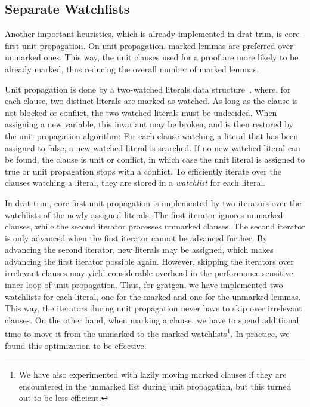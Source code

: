 \documentclass[smallcondensed]{svjour3}     %
\begin{document}
\subsection{Separate Watchlists}
Another important heuristics, which is already implemented in drat-trim, is core-first unit propagation.
On unit propagation, marked lemmas are preferred over unmarked ones. This way, the unit clauses used for a proof are more likely to be already marked,
thus reducing the overall number of marked lemmas.

Unit propagation is done by a two-watched literals data structure~\cite{MMZZ01},
where, for each clause, two distinct literals are marked as watched. As long as the clause is not blocked or conflict, the two watched literals must be undecided.
When assigning a new variable, this invariant may be broken, and is then restored by the unit propagation algorithm: For each clause watching a literal that has been 
assigned to false, a new watched literal is searched. If no new watched literal can be found, the clause is unit or conflict, in which case the unit literal is 
assigned to true or unit propagation stops with a conflict. To efficiently iterate over the clauses watching a literal, they are stored in a \emph{watchlist} for 
each literal.

In drat-trim, core first unit propagation is implemented by two iterators over the watchlists of the newly assigned literals.
The first iterator ignores unmarked clauses, while 
the second iterator processes unmarked clauses. The second iterator is only advanced when the first iterator cannot be advanced further. By advancing the second 
iterator, new literals may be assigned, which makes advancing the first iterator possible again.
However, skipping the iterators over irrelevant clauses may yield considerable overhead in the performance sensitive inner loop of unit propagation.
Thus, for gratgen, we have implemented two watchlists for each literal, one for the marked and one for the unmarked lemmas. 
This way, the iterators during unit propagation never have to skip over irrelevant clauses. On the other hand, when marking a clause, we have to spend additional time
to move it from the unmarked to the marked watchlists\footnote{We have also experimented with lazily moving marked clauses if they are encountered in the unmarked list during unit propagation, but this turned out to be less efficient.}. In practice, we found this optimization to be effective.
\end{document}
